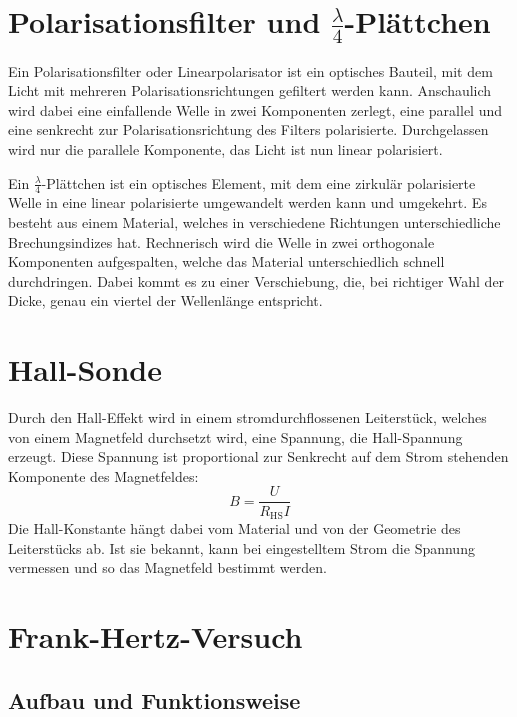 \section{Polarisationsfilter und $\frac{\lambda}4$-Plättchen}

Ein Polarisationsfilter oder Linearpolarisator ist ein optisches Bauteil, mit
dem Licht mit mehreren Polarisationsrichtungen gefiltert werden kann.
Anschaulich wird dabei eine einfallende Welle in zwei Komponenten zerlegt, eine
parallel und eine senkrecht zur Polarisationsrichtung des Filters polarisierte.
Durchgelassen wird nur die parallele Komponente, das Licht ist nun linear
polarisiert.

Ein $\frac\lambda4$-Plättchen ist ein optisches Element, mit dem eine zirkulär
polarisierte Welle in eine linear polarisierte umgewandelt werden kann und
umgekehrt. Es besteht aus einem Material, welches in verschiedene Richtungen
unterschiedliche Brechungsindizes hat. Rechnerisch wird die Welle in zwei
orthogonale Komponenten aufgespalten, welche das Material unterschiedlich
schnell durchdringen. Dabei kommt es zu einer Verschiebung, die, bei richtiger
Wahl der Dicke, genau ein viertel der Wellenlänge entspricht.

\section{Hall-Sonde}

Durch den Hall-Effekt wird in einem stromdurchflossenen Leiterstück, welches
von einem Magnetfeld durchsetzt wird, eine Spannung, die Hall-Spannung erzeugt.
Diese Spannung ist proportional zur Senkrecht auf dem Strom stehenden
Komponente des Magnetfeldes:
\[
    B = \frac{U}{R_\text{HS}I}
\]
Die Hall-Konstante hängt dabei vom Material und von der Geometrie des
Leiterstücks ab. Ist sie bekannt, kann bei eingestelltem Strom die Spannung
vermessen und so das Magnetfeld bestimmt werden.

\section{Frank-Hertz-Versuch}

\subsection{Aufbau und Funktionsweise}
\label{ssec:Aufbau_FH}

